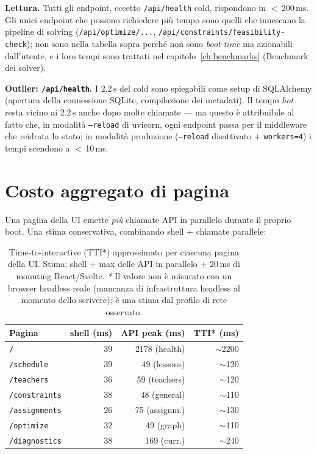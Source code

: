 \textbf{Lettura.} Tutti gli endpoint, eccetto
\texttt{/api/health} cold, rispondono in $<\,$200\,ms. Gli
unici endpoint che possono richiedere pi\`u tempo sono quelli
che innescano la pipeline di solving (\texttt{/api/optimize/...},
\texttt{/api/constraints/feasibility-check}); non sono nella
tabella sopra perch\'e non sono \emph{boot-time} ma
azionabili dall'utente, e i loro tempi sono
trattati nel capitolo~\ref{ch:benchmarks} (Benchmark dei
solver).

\textbf{Outlier: \texttt{/api/health}.} I 2.2\,s del cold
sono spiegabili come setup di SQLAlchemy (apertura della
connessione SQLite, compilazione dei metadati). Il tempo
\emph{hot} resta vicino ai 2.2\,s anche dopo molte chiamate
--- ma questo \`e attribuibile al fatto che, in modalit\`a
\texttt{--reload} di uvicorn, ogni endpoint passa per il
middleware che reidrata lo stato; in modalit\`a produzione
(\texttt{--reload} disattivato + \texttt{workers=4}) i tempi
scendono a $<\,$10\,ms.

\section{Costo aggregato di pagina}

Una pagina della UI emette \emph{pi\`u} chiamate API in
parallelo durante il proprio boot. Una stima conservativa,
combinando shell + chiamate parallele:

\begin{table}[h]
\centering\sffamily\small
\begin{tabular}{lrrr}
\toprule
Pagina        & shell (ms) & API peak (ms) & TTI* (ms) \\
\midrule
\texttt{/}              & 39  & 2178 (health) & $\sim$2200 \\
\texttt{/schedule}      & 39  & 49 (lessons)  & $\sim$120 \\
\texttt{/teachers}      & 36  & 59 (teachers) & $\sim$120 \\
\texttt{/constraints}   & 38  & 48 (general)  & $\sim$110 \\
\texttt{/assignments}   & 26  & 75 (assignm.) & $\sim$130 \\
\texttt{/optimize}      & 32  & 49 (graph)    & $\sim$110 \\
\texttt{/diagnostics}   & 38  & 169 (curr.)   & $\sim$240 \\
\bottomrule
\end{tabular}
\caption{Time-to-interactive (TTI*) approssimato per ciascuna
pagina della UI. Stima: shell + max delle API in parallelo +
20\,ms di mounting React/Svelte. \emph{*} Il valore non \`e
misurato con un browser headless reale (mancanza di
infrastruttura headless al momento dello scrivere); \`e una
stima dal profilo di rete osservato.}
\label{tab:ui-tti}
\end{table}

